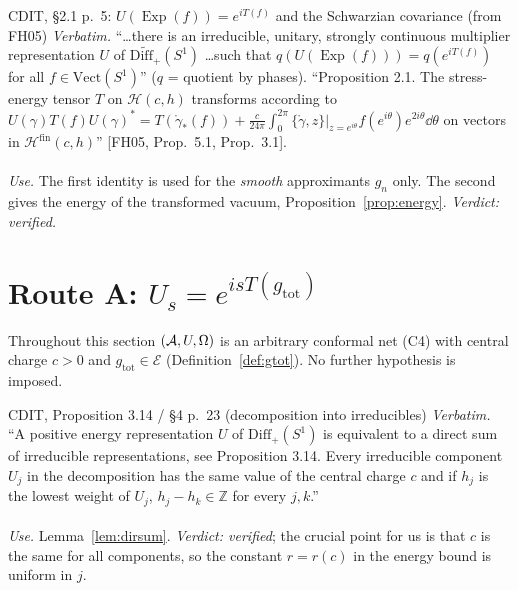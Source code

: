 \documentclass[11pt]{article}
\newcommand{\Om}{\Omega}
\newcommand{\Hil}{\mathcal H}
\newcommand{\Diff}{\mathrm{Diff}_+}
\newcommand{\Vect}{\mathrm{Vect}}
\newcommand{\gtot}{g_{\mathrm{tot}}}
\newcommand{\Exp}{\operatorname{Exp}}
\begin{document}
\begin{citedbox}{CDIT, \S2.1 p.~5: $U(\Exp(f))=e^{iT(f)}$ and the Schwarzian covariance (from FH05)}
\emph{Verbatim.}  ``\dots there is an irreducible, unitary, strongly continuous multiplier representation $U$ of
$\widetilde{\Diff}(S^1)$ \dots such that $q(U(\Exp(f)))=q(e^{iT(f)})$ for all $f\in\Vect(S^1)$'' ($q$ = quotient by
phases).  ``Proposition 2.1.  The stress-energy tensor $T$ on $\Hil(c,h)$ transforms according to
$U(\gamma)T(f)U(\gamma)^*=T(\mathring\gamma_*(f))+\frac c{24\pi}\int_0^{2\pi}\{\mathring\gamma,z\}|_{z=e^{i\theta}}
f(e^{i\theta})e^{2i\theta}\dd\theta$ on vectors in $\Hil^{\mathrm{fin}}(c,h)$'' [FH05, Prop.~5.1, Prop.~3.1].\\[2pt]
\\[2pt]
\emph{Use.}  The first identity is used for the \emph{smooth} approximants $g_n$ only.  The second gives the energy of
the transformed vacuum, Proposition~\ref{prop:energy}.  \emph{Verdict: verified.}
\end{citedbox}

\section{Route A: $U_s=e^{is T(\gtot)}$}\label{sec:routeA}

Throughout this section $(\cA,U,\Om)$ is an arbitrary conformal net (C4) with central charge $c>0$ and
$\gtot\in\mathcal E$ (Definition~\ref{def:gtot}).  No further hypothesis is imposed.

\begin{citedbox}{CDIT, Proposition 3.14 / \S4 p.~23 (decomposition into irreducibles)}
\emph{Verbatim.}  ``A positive energy representation $U$ of $\Diff(S^1)$ is equivalent to a direct sum of irreducible
representations, see Proposition 3.14.  Every irreducible component $U_j$ in the decomposition has the same value of
the central charge $c$ and if $h_j$ is the lowest weight of $U_j$, $h_j-h_k\in\mathbb Z$ for every $j,k$.''\\[2pt]
\\[2pt]
\emph{Use.}  Lemma~\ref{lem:dirsum}.  \emph{Verdict: verified}; the crucial point for us is that $c$ is the same for
all components, so the constant $r=r(c)$ in the energy bound is uniform in $j$.
\end{citedbox}
\end{document}
